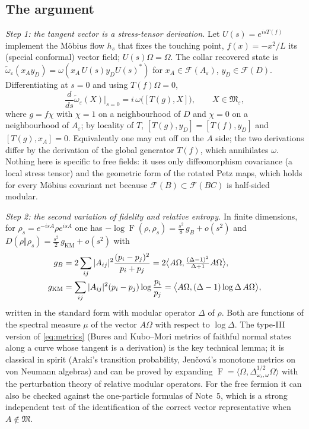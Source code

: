 \documentclass[11pt]{article}
\theoremstyle{accent}
\theoremstyle{definition}
\newcommand{\cF}{\mathcal{F}}
\newcommand{\cM}{\mathfrak{M}}
\newcommand{\eps}{\varepsilon}
\newcommand{\Fid}{\operatorname{F}}
\begin{document}
\subsection{The argument}

\emph{Step 1: the tangent vector is a stress-tensor derivation.}
Let \(U(s)=e^{isT(f)}\) implement the M\"obius flow \(h_s\) that fixes the touching point, \(f(x)=-x^2/L\) its (special conformal) vector field; \(U(s)\Omega=\Omega\).  The collar recovered state is \(\widetilde\omega_\eps(x_Ay_D)=\omega(x_A\,U(s)y_DU(s)^*)\) for \(x_A\in\cF(A_\eps)\), \(y_D\in\cF(D)\).  Differentiating at \(s=0\) and using \(T(f)\Omega=0\),
\begin{equation}\label{eq:tangent}
 \frac{d}{ds}\widetilde\omega_\eps(X)\Big|_{s=0}=i\,\omega\bigl([T(g),X]\bigr),\qquad X\in\cM_\eps,
\end{equation}
where \(g=f\chi\) with \(\chi=1\) on a neighbourhood of \(D\) and \(\chi=0\) on a neighbourhood of \(A_\eps\); by locality of \(T\), \([T(g),y_D]=[T(f),y_D]\) and \([T(g),x_A]=0\).  Equivalently one may cut off on the \(A\) side; the two derivations differ by the derivation of the global generator \(T(f)\), which annihilates \(\omega\).  Nothing here is specific to free fields: it uses only diffeomorphism covariance (a local stress tensor) and the geometric form of the rotated Petz maps, which holds for every M\"obius covariant net because \(\cF(B)\subset\cF(BC)\) is half-sided modular.

\emph{Step 2: the second variation of fidelity and relative entropy.}
In finite dimensions, for \(\rho_s=e^{-isA}\rho e^{isA}\) one has \(-\log\Fid(\rho,\rho_s)=\frac{s^2}{8}\,g_B+o(s^2)\) and \(D(\rho\Vert\rho_s)=\frac{s^2}{2}\,g_{\mathrm{KM}}+o(s^2)\) with
\begin{align}
 g_B&=2\sum_{ij}|A_{ij}|^2\frac{(p_i-p_j)^2}{p_i+p_j}=2\bigl\langle A\Omega,\tfrac{(\Delta-1)^2}{\Delta+1}A\Omega\bigr\rangle,\label{eq:metrics}\\
 g_{\mathrm{KM}}&=\sum_{ij}|A_{ij}|^2(p_i-p_j)\log\frac{p_i}{p_j}=\bigl\langle A\Omega,(\Delta-1)\log\Delta\,A\Omega\bigr\rangle,\notag
\end{align}
written in the standard form with modular operator \(\Delta\) of \(\rho\).  Both are functions of the spectral measure \(\mu\) of the vector \(A\Omega\) with respect to \(\log\Delta\).  The type-III version of \eqref{eq:metrics} (Bures and Kubo--Mori metrics of faithful normal states along a curve whose tangent is a derivation) is the key technical lemma; it is classical in spirit (Araki's transition probability, Jen\v cov\'a's monotone metrics on von Neumann algebras) and can be proved by expanding \(\Fid=\langle\Omega,\Delta_{\omega_s,\omega}^{1/2}\Omega\rangle\) with the perturbation theory of relative modular operators.  For the free fermion it can also be checked against the one-particle formulas of Note~5, which is a strong independent test of the identification of the correct vector representative when \(A\notin\cM\).
\end{document}
